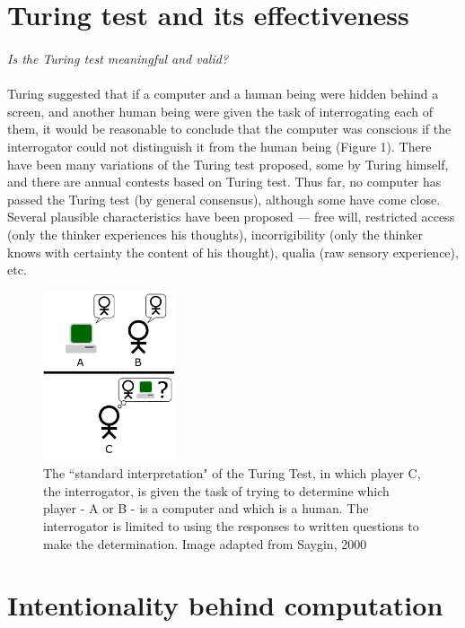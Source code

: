 \documentclass[a4paper]{article}
\begin{document}
	\section{Turing test and its effectiveness}
	\paragraph{}
	\textit{Is the Turing test\cite{turing50} meaningful and valid?}
	\paragraph{}
	Turing suggested that if a computer and a human being were hidden behind a screen, and another
	human being were given the task of interrogating each of them, it would be reasonable to conclude that the computer was conscious if the interrogator could not distinguish it
	from the human being (Figure 1). There have been many variations of the Turing test proposed, some by Turing himself, and there are annual contests based on Turing test. Thus far, no computer has
	passed the Turing test (by general consensus), although some have come close. Several plausible characteristics have been proposed — free will, restricted access (only the thinker experiences his thoughts), incorrigibility (only the thinker knows with certainty the content of his thought), qualia (raw sensory experience), etc.
		\begin{figure}
			\centering
			\includegraphics[height=5cm]{Turing_Test}
				\caption{The ``standard interpretation" of the Turing Test, in which player C, the interrogator, is given the task of trying to determine which player - A or B - is a computer and which is a human. The interrogator is limited to using the responses to written questions to make the determination. Image adapted from Saygin, 2000\cite{saygin00}}
		\end{figure}
		
	\section{Intentionality behind computation}
\end{document}
